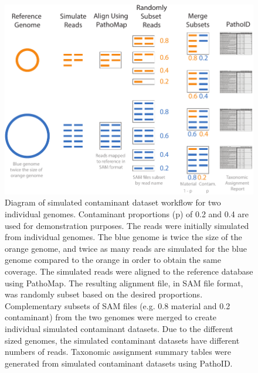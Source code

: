 \documentclass[fleqn,10pt,lineno]{wlpeerj}\usepackage[]{graphicx}\usepackage[]{color}
\makeatletter
\def\maxwidth{ %
  \ifdim\Gin@nat@width>\linewidth
    \linewidth
  \else
    \Gin@nat@width
  \fi
}
\newenvironment{knitrout}{}{} %
\makeatother
\begin{document}
\begin{knitrout}
\color{fgcolor}\begin{figure}
\includegraphics[width=\maxwidth]{figure/contam_simulation} \caption[Diagram of simulated contaminant dataset workflow for two individual genomes]{Diagram of simulated contaminant dataset workflow for two individual genomes. Contaminant proportions (p) of 0.2 and 0.4 are used for demonstration purposes. The reads were initially simulated from individual genomes. The blue genome is twice the size of the orange genome, and twice as many reads are simulated for the blue genome compared to the orange in order to obtain the same coverage. The simulated reads were aligned to the reference database using PathoMap. The resulting alignment file, in SAM file format, was randomly subset based on the desired proportions. Complementary subsets of SAM files (e.g. 0.8 material and 0.2 contaminant) from the two genomes were merged to create individual simulated contaminant datasets.  Due to the different sized genomes, the simulated contaminant datasets have different numbers of reads. Taxonomic assignment summary tables were generated from simulated contaminant datasets using PathoID.}\label{fig:contam_simulation}
\end{figure}


\end{knitrout}
\end{document}
